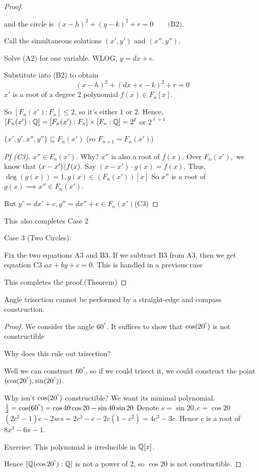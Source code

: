 \documentclass[notes.tex]{subfiles}
\begin{document}
\begin{proof}
\begin{tabin}
		and the circle is
		$(x-h)^2 + (y-k)^2 + r = 0 \qquad\text{(B2)}$.

		Call the simultaneous solutions $(x', y')$ and $(x'', y'')$.

		Solve (A2) for one variable. WLOG, $y = dx + e$.

		Substitute into (B2) to obtain 
		\[
			(x-h)^2 + (dx+e-k)^2 + r =0
		\]
		$x'$ is a root of a degree 2 polynomial $f(x)\in F_n[x]$.

		So $[F_n(x'):F_n]\le 2$, so it's either 1 or 2.
		Hence, $[F_n(x'):\mathbb{Q}]=[F_n(x'):F_n]\times[F_n:\mathbb{Q}] = 2^\ell$ or $2^{\ell+1}$ 

		\begin{claim}[3]
			$\{x', y', x'', y''\}\subseteq F_n(x')$ (so $F_{n+1} = F_n(x')$)
		\end{claim}
		\begin{proof}[Pf (C3)]
			$x''\in F_n(x')$\checkmark.
			Why? $x''$ is also a root of $f(x)$. Over $F_n(x'),$ we know that $(x-x')\mkern2mu|\mkern1mu f(x).$ Say $(x-x')\cdot g(x) = f(x)$. Thus, $\deg(g(x)) =1, g(x)\in (F_n(x'))[x]$ So $x''$ is a root of $g(x)\implies x''\in F_n(x')$. 

			But $y' = dx' +e, y'' = dx'' + e \in F_n(x')$\qedhere(C3)
		\end{proof}
		This also completes Case 2
	\end{tabin}
	Case 3 (Two Circles):
	\begin{tabin}
		Fix the two equations A3 and B3. If we subtract B3 from A3, then we get equation C3 $ax+by+c=0$.
		This is handled in a previous case
	\end{tabin}
	This completes the proof.\qedhere(Theorem)
\end{proof}

\begin{corollary}
	Angle trisection cannot be performed by a straight-edge and compass construction.
\end{corollary}
\begin{proof}
	We consider the angle $60^\degree$.
	It suffices to show that $\cos(20^\degree)$ is not constructible

	Why does this rule out trisection?

	Well we can construct $60^\degree$, so if we could trisect it, we could construct  the point $(\cos(20^\degree), \sin(20^\degree))$.

	Why isn't $\cos(20^\degree)$ constructible? 
	We want its minimal polynomial. $\frac{1}{2} = \cos(60^\degree) = \cos 40 \cos 20 - \sin 40 \sin 20$
	Denote $s = \sin 20, c = \cos 20$
	$(2c^2-1)c -2scs = 2c^3 - c - 2c(1-c^2)=4c^3-3c$.
	Hence $c$ is a root of $8x^3 - 6x - 1$.

	Exercise: This polynomial is irreducible in $\mathbb{Q}[x]$.

	Hence $[\mathbb{Q}(\cos 20^\degree):\mathbb{Q}]$ is not a power of 2, so $\cos20$ is not constructible.
\end{proof}
\end{document}
